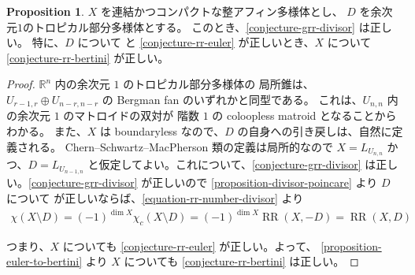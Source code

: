 \documentclass[a4paper,dvipdfmx,reqno,12pt]{amsart}
\theoremstyle{definition}
\newtheorem{proposition}[theorem]{Proposition}
\newcommand{\opn}[1]{\operatorname{#1}}
\numberwithin{equation}{section}
\begin{document}
\begin{proposition}
$X$ を連結かつコンパクトな整アフィン多様体とし、
$D$ を余次元$1$のトロピカル部分多様体とする。
このとき、\cref{conjecture-grr-divisor} は正しい。
特に、$D$ について\cite[Conjecture 6.13]{demedrano2023chern}
と \cref{conjecture-rr-euler} 
が正しいとき、$X$ について \cref{conjecture-rr-bertini}
が正しい。
\end{proposition}
\begin{proof}
$\mathbb{R}^n$ 内の余次元 $1$ のトロピカル部分多様体の
局所錐は、$U_{r-1,r}\oplus U_{n-r,n-r}$ の
Bergman fan のいずれかと同型である。
これは、$U_{n,n}$ 内の余次元 $1$ のマトロイドの双対が
階数 $1$ の coloopless matroid となることからわかる。
また、$X$ は boundaryless なので、$D$
の自身への引き戻しは、自然に定義される。
Chern--Schwartz--MacPherson 類の定義は局所的なので
$X=L_{U_{n,n}}$ かつ、$D=L_{U_{n-1,n}}$ 
と仮定してよい。これについて、\cref{conjecture-grr-divisor}
は正しい。\cref{conjecture-grr-divisor} が正しいので
\cref{proposition-divisor-poincare} より
$D$ について \cite[Conjecture 6.13]{demedrano2023chern}
が正しいならば、\eqref{equation-rr-number-divisor}
より
\begin{align}
\chi(X\setminus D)=(-1)^{\dim X}\chi_c(X\setminus D)
=(-1)^{\dim X}\opn{RR}(X,-D)
=\opn{RR}(X,D)
\end{align}

つまり、$X$ についても \cref{conjecture-rr-euler}
が正しい。よって、
\cref{proposition-euler-to-bertini} より
$X$ についても \cref{conjecture-rr-bertini} は正しい。

\end{proof}





\end{document}
